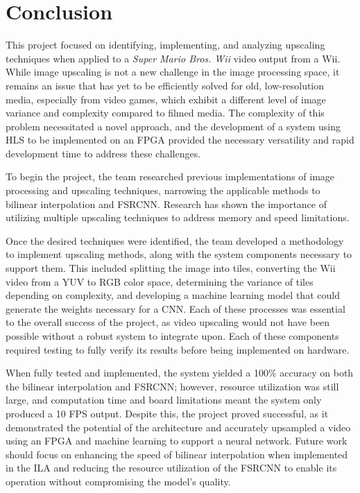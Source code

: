 \documentclass{article}
\begin{document}
\newpage\section{Conclusion}
\noindent This project focused on identifying, implementing, and analyzing upscaling techniques when applied to a \textit{Super Mario Bros. Wii} video output from a Wii. While image upscaling is not a new challenge in the image processing space, it remains an issue that has yet to be efficiently solved for old, low-resolution media, especially from video games, which exhibit a different level of image variance and complexity compared to filmed media. The complexity of this problem necessitated a novel approach, and the development of a system using HLS to be implemented on an FPGA provided the necessary versatility and rapid development time to address these challenges. 

\par To begin the project, the team researched previous implementations of image processing and upscaling techniques, narrowing the applicable methods to bilinear interpolation and FSRCNN. Research has shown the importance of utilizing multiple upscaling techniques to address memory and speed limitations.

\par Once the desired techniques were identified, the team developed a methodology to implement upscaling methods, along with the system components necessary to support them. This included splitting the image into tiles, converting the Wii video from a YUV to RGB color space, determining the variance of tiles depending on complexity, and developing a machine learning model that could generate the weights necessary for a CNN. Each of these processes was essential to the overall success of the project, as video upscaling would not have been possible without a robust system to integrate upon. Each of these components required testing to fully verify its results before being implemented on hardware.

\par When fully tested and implemented, the system yielded a 100\% accuracy on both the bilinear interpolation and FSRCNN; however, resource utilization was still large, and computation time and board limitations meant the system only produced a 10 FPS output. Despite this, the project proved successful, as it demonstrated the potential of the architecture and accurately upsampled a video using an FPGA and machine learning to support a neural network. Future work should focus on enhancing the speed of bilinear interpolation when implemented in the ILA and reducing the resource utilization of the FSRCNN to enable its operation without compromising the model's quality. 
\end{document}
